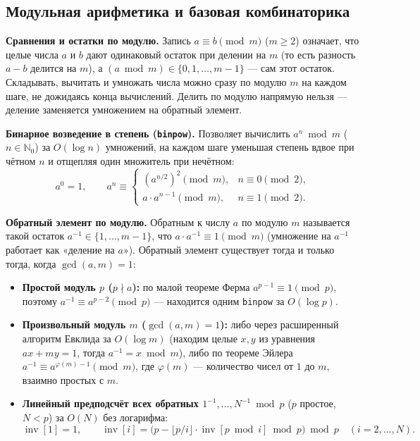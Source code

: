 \documentclass[10pt,a4paper]{article}
\renewcommand{\ge}{\geqslant}
\newcommand{\N}{\mathbb{N}}
\DeclareMathOperator{\inv}{inv}
\begin{document}
\subsection{Модульная арифметика и базовая комбинаторика}

\textbf{Сравнения и остатки по модулю.} Запись $a \equiv b \pmod m$ ($m \ge 2$) означает, что целые числа $a$ и $b$ дают одинаковый остаток при делении на $m$ (то есть разность $a - b$ делится на $m$), а $(a \bmod m) \in \{0, 1, \dots, m - 1\}$ — сам этот остаток. Складывать, вычитать и умножать числа можно сразу по модулю $m$ на каждом шаге, не дожидаясь конца вычислений. Делить по модулю напрямую нельзя — деление заменяется умножением на обратный элемент.

\textbf{Бинарное возведение в степень (\texttt{binpow}).} Позволяет вычислить $a^n \bmod m$ ($n \in \N_0$) за $O(\log n)$ умножений, на каждом шаге уменьшая степень вдвое при чётном $n$ и отщепляя один множитель при нечётном:
\[
  a^0 = 1, \qquad
  a^n \equiv
  \begin{cases}
    (a^{n/2})^2 \pmod m, & n \equiv 0 \pmod 2, \\
    a \cdot a^{n-1} \pmod m, & n \equiv 1 \pmod 2.
  \end{cases}
\]

\textbf{Обратный элемент по модулю.} Обратным к числу $a$ по модулю $m$ называется такой остаток $a^{-1} \in \{1, \dots, m - 1\}$, что $a \cdot a^{-1} \equiv 1 \pmod m$ (умножение на $a^{-1}$ работает как «деление на $a$»). Обратный элемент существует тогда и только тогда, когда $\gcd(a, m) = 1$:
\begin{itemize}
  \item \textbf{Простой модуль $p$ ($p \nmid a$):} по малой теореме Ферма $a^{p-1} \equiv 1 \pmod p$, поэтому $a^{-1} \equiv a^{p-2} \pmod p$ — находится одним \texttt{binpow} за $O(\log p)$.
  \item \textbf{Произвольный модуль $m$ ($\gcd(a, m) = 1$):} либо через расширенный алгоритм Евклида за $O(\log m)$ (находим целые $x, y$ из уравнения $ax + my = 1$, тогда $a^{-1} = x \bmod m$), либо по теореме Эйлера $a^{-1} \equiv a^{\varphi(m)-1} \pmod m$, где $\varphi(m)$ — количество чисел от $1$ до $m$, взаимно простых с $m$.
  \item \textbf{Линейный предподсчёт всех обратных $1^{-1}, \dots, N^{-1} \bmod p$} ($p$ простое, $N < p$) за $O(N)$ без логарифма:
  \[
    \inv[1] = 1, \qquad \inv[i] = \bigl(p - \lfloor p / i \rfloor \cdot \inv[p \bmod i] \bmod p\bigr) \bmod p \quad (i = 2, \dots, N).
  \]
\end{itemize}
\end{document}
